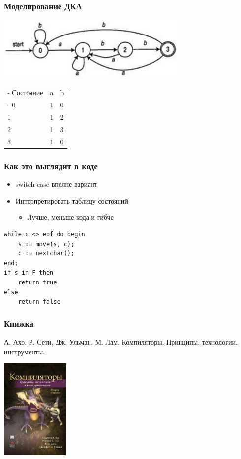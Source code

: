 \documentclass[xetex,mathserif,serif]{beamer}
\begin{document}
	\begin{frame}
		\frametitle{Моделирование ДКА}
		\begin{center}
			\includegraphics[width=0.7\textwidth]{abbDfa.png}
		\end{center}
		\begin{center}
			\begin{tabu} {| X[0.9 l p] | X[1 l p] | X[1 l p] |}
				\tabucline-
				Состояние              & a         & b  \\
				\tabucline-
				\everyrow{\tabucline-}
				0                      & 1         & 0  \\
				1                      & 1         & 2  \\
				2                      & 1         & 3  \\
				3                      & 1         & 0  \\
			\end{tabu}
		\end{center}
	\end{frame}

	\begin{frame}[fragile]
		\frametitle{Как это выглядит в коде}
		\begin{itemize}
			\item switch-case вполне вариант
			\item Интерпретировать таблицу состояний
			\begin{itemize}
				\item Лучше, меньше кода и гибче
			\end{itemize}
		\end{itemize}
		\begin{verbatim}
while c <> eof do begin
    s := move(s, c);
    c := nextchar();
end;
if s in F then
    return true
else
    return false
		\end{verbatim}
	\end{frame}

	\begin{frame}
		\frametitle{Книжка}
		А. Ахо, Р. Сети, Дж. Ульман, М. Лам. Компиляторы. Принципы, технологии, инструменты.
		\begin{center}
			\includegraphics[width=0.25\textwidth]{compilersCover.png}
		\end{center}
	\end{frame}
\end{document}
